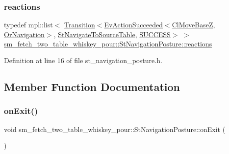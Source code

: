 \subsubsection{\texorpdfstring{reactions}{reactions}}
{\footnotesize\ttfamily typedef mpl\+::list$<$ \hyperlink{classsmacc_1_1Transition}{Transition}$<$\hyperlink{structsmacc_1_1default__events_1_1EvActionSucceeded}{Ev\+Action\+Succeeded}$<$\hyperlink{classcl__move__base__z_1_1ClMoveBaseZ}{Cl\+Move\+BaseZ}, \hyperlink{classsm__fetch__two__table__whiskey__pour_1_1OrNavigation}{Or\+Navigation}$>$, \hyperlink{structsm__fetch__two__table__whiskey__pour_1_1StNavigateToSourceTable}{St\+Navigate\+To\+Source\+Table}, \hyperlink{structsmacc_1_1default__transition__tags_1_1SUCCESS}{S\+U\+C\+C\+E\+SS}$>$ $>$ \hyperlink{structsm__fetch__two__table__whiskey__pour_1_1StNavigationPosture_a4367f8be96d80533965e34ed22042e1f}{sm\+\_\+fetch\+\_\+two\+\_\+table\+\_\+whiskey\+\_\+pour\+::\+St\+Navigation\+Posture\+::reactions}}



Definition at line 16 of file st\+\_\+navigation\+\_\+posture.\+h.



\subsection{Member Function Documentation}
\mbox{\label{structsm__fetch__two__table__whiskey__pour_1_1StNavigationPosture_a5e0e6613c360a4787eea61e57c9820f9}} 
\subsubsection{\texorpdfstring{on\+Exit()}{onExit()}}
{\footnotesize\ttfamily void sm\+\_\+fetch\+\_\+two\+\_\+table\+\_\+whiskey\+\_\+pour\+::\+St\+Navigation\+Posture\+::on\+Exit (\begin{DoxyParamCaption}{ }\end{DoxyParamCaption})\hspace{0.3cm}{\ttfamily [inline]}}



